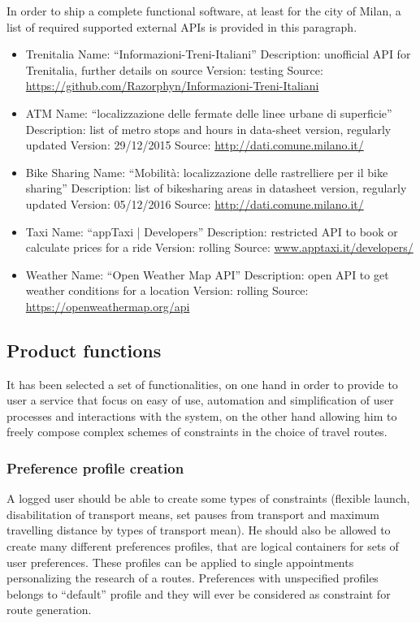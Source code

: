 In order to ship a complete functional software, at least for the city of Milan, a list of required supported external APIs is provided in this paragraph.

\begin{itemize}
	\item Trenitalia
	\subitem Name: “Informazioni-Treni-Italiani”
	\subitem Description: unofficial API for Trenitalia, further details on source
	\subitem Version: testing
	\subitem Source: \url{https://github.com/Razorphyn/Informazioni-Treni-Italiani}
	
	\item ATM
	\subitem Name: “localizzazione delle fermate delle linee urbane di superficie”
	\subitem Description: list of metro stops and hours in data-sheet version, regularly updated
	\subitem Version: 29/12/2015
	\subitem Source: \url{http://dati.comune.milano.it/}
	
	\item Bike Sharing
	\subitem Name: “Mobilità: localizzazione delle rastrelliere per il bike sharing”
	\subitem Description: list of bikesharing areas in datasheet version, regularly updated
	\subitem Version: 05/12/2016
	\subitem Source: \url{http://dati.comune.milano.it/}
	
	\item Taxi
	\subitem Name: “appTaxi | Developers”
	\subitem Description: restricted API to book or calculate prices for a ride
	\subitem Version: rolling
	\subitem Source: \url{www.apptaxi.it/developers/}
	
	\item Weather
	\subitem Name: “Open Weather Map API”
	\subitem Description: open API to get weather conditions for a location
	\subitem Version: rolling
	\subitem Source: \url{https://openweathermap.org/api}
	
\end{itemize}
\subsection{Product functions}

It has been selected a set of functionalities, on one hand in order to provide to user a service that focus on easy of use, automation and simplification of user processes and interactions with the system, on the other hand allowing him to freely compose complex schemes of constraints in the choice of travel routes.

\subsubsection{Preference profile creation}
A logged user should be able to create some types of constraints (flexible launch, disabilitation of transport means, set pauses from transport and maximum travelling distance by types of transport mean). He should also be allowed to create many different preferences profiles, that are logical containers for sets of user preferences. These profiles can be applied to single appointments personalizing the research of a routes. Preferences with unspecified profiles belongs to “default” profile and they will ever be considered as constraint for route generation.

